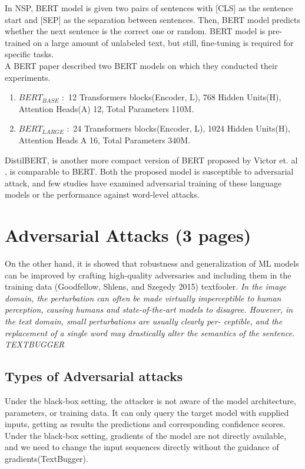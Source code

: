 \documentclass[%
	BCOR=8mm, %
	DIV=12, 
	toc=bibliography, %
	toc=listof, %
	oneside, %
	egregdoesnotlikesansseriftitles, %
	]{scrbook}
\begin{document}
In NSP, BERT model is given two pairs of sentences with [CLS] as the sentence start and [SEP] as the separation between sentences. Then, BERT model predicts whether the next sentence 
is the correct one or random. BERT model is pre-trained on a large amount of unlabeled text, but still, fine-tuning is required for specific tasks.\\

A BERT paper \cite{devlin_bert_2019} described two BERT models on which they conducted their experiments.
\begin{enumerate}
\item $BERT_{BASE}$ $:$ 12 Transformers blocks(Encoder, L), 768 Hidden Units(H), Attention Heads(A) 12, Total Parameters 110M.
\item $BERT_{LARGE}$ $:$ 24 Transformers blocks(Encoder, L), 1024 Hidden Units(H), Attention Heads A 16, Total Parameters 340M.
\end{enumerate}
DistilBERT, is another more compact version of BERT proposed by Victor et$.$ al \cite{sanh_distilbert_2020}, is comparable to BERT. Both the proposed model is susceptible to adversarial 
attack, and few studies have examined adversarial training of these language models or the performance against word-level attacks.\\



\section{Adversarial Attacks (3 pages)}
On the other hand, it is showed that robustness and generalization of ML models can be improved by crafting high-quality adversaries and including them in the training data 
(Goodfellow, Shlens, and Szegedy 2015) textfooler. \textit{In the image domain, the perturbation can often be made virtually imperceptible to human perception, causing humans 
and state-of-the-art models to disagree. However, in the text domain, small perturbations are usually clearly per- ceptible, and the replacement of a single word may drastically alter 
the semantics of the sentence. TEXTBUGGER }

\subsection{Types of Adversarial attacks}
Under the black-box setting, the attacker is not aware of the model architecture, parameters, or training data. It can only query the target model with supplied inputs, getting as 
results the predictions and corresponding confidence scores. Under the black-box setting, gradients of the model are not directly available, and we need to change the input sequences
 directly without the guidance of gradients(TextBugger). 
\end{document}
